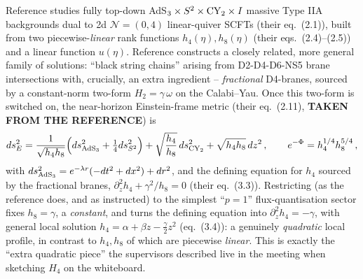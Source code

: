 \documentclass[11pt]{article}
\begin{document}
Reference \cite{Fatemiabhari:2025qcg} studies fully top-down AdS$_3\times S^2\times{\rm CY}_2\times I$ massive Type IIA backgrounds dual to 2d $\mathcal N=(0,4)$ linear-quiver SCFTs (their eq.~(2.1)), built from two piecewise-\emph{linear} rank functions $h_4(\eta),h_8(\eta)$ (their eqs.~(2.4)--(2.5)) and a linear function $u(\eta)$. Reference \cite{Couzens:2021tnq} constructs a closely related, more general family of solutions: ``black string chains'' arising from D2-D4-D6-NS5 brane intersections with, crucially, an extra ingredient -- \emph{fractional} D4-branes, sourced by a constant-norm two-form $H_2=\gamma\,\omega$ on the Calabi--Yau. Once this two-form is switched on, the near-horizon Einstein-frame metric (their eq.~(2.11), \textbf{TAKEN FROM THE REFERENCE}) is
\begin{equation}
ds_E^2 = \frac{1}{\sqrt{h_4h_8}}\Big(ds^2_{{\rm AdS}_3}+\tfrac14 ds^2_{S^2}\Big) + \sqrt{\frac{h_4}{h_8}}\,ds^2_{{\rm CY}_2} + \sqrt{h_4h_8}\,dz^2\,,
\qquad
e^{-\Phi}=h_4^{1/4}h_8^{5/4}\,,
\label{eq:bs-metric}
\end{equation}
with $ds^2_{{\rm AdS}_3}=e^{-\lambda r}(-dt^2+dx^2)+dr^2$, and the defining equation for $h_4$ sourced by the fractional branes, $\partial_z^2h_4+\gamma^2/h_8=0$ (their eq.~(3.3)). Restricting (as the reference does, and as instructed) to the simplest ``$p=1$'' flux-quantisation sector fixes $h_8=\gamma$, a \emph{constant}, and turns the defining equation into $\partial_z^2h_4=-\gamma$, with general local solution $h_4=\alpha+\beta z-\tfrac{\gamma}{2}z^2$ (eq.~(3.4)): a genuinely \emph{quadratic} local profile, in contrast to $h_4,h_8$ of \cite{Fatemiabhari:2025qcg} which are piecewise \emph{linear}. This is exactly the ``extra quadratic piece'' the supervisors described live in the meeting when sketching $H_4$ on the whiteboard.
\end{document}
